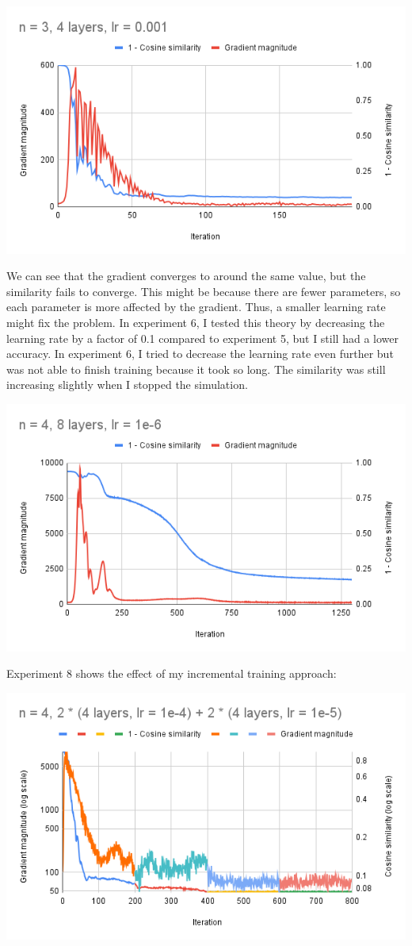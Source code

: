 \documentclass{article}
\begin{document}
\includegraphics[width=0.8\linewidth]{img/n3l4r3.png}

We can see that the gradient converges to around the same value, but the
similarity fails to converge. This might be because there are fewer parameters,
so each parameter is more affected by the gradient. Thus, a smaller learning
rate might fix the problem. In experiment 6, I tested this theory by decreasing
the learning rate by a factor of 0.1 compared to experiment 5, but I still had a
lower accuracy. In experiment 6, I tried to decrease the learning rate even
further but was not able to finish training because it took so long. The
similarity was still increasing slightly when I stopped the simulation.

\includegraphics[width=0.8\linewidth]{img/n4l8r6.png}

Experiment 8 shows the effect of my incremental training approach:

\includegraphics[width=0.8\linewidth]{img/n4l4l4r4l4l4r5.png}
\end{document}
